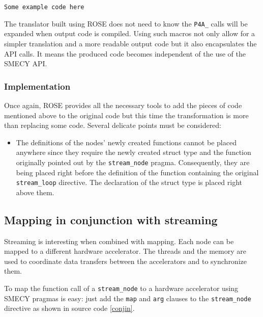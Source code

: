 \documentclass [A4]{article}
\begin{document}
	\begin{lstlisting}[label=streamoutput,caption={}]
	Some example code here
	\end{lstlisting}
	
	The translator built using ROSE does not need to know the \verb+P4A_+ calls will be expanded when output code is compiled. Using such macros not only allow for a simpler translation and a more readable output code but it also encapsulates the API calls. It means the produced code becomes independent of the use of the SMECY API.
	
	\subsubsection{Implementation} Once again, ROSE provides all the necessary tools to add the pieces of code mentioned above to the original code but this time the transformation is more than replacing some code. Several delicate points must be considered:
	\begin{itemize}
		\item The definitions of the nodes' newly created functions cannot be placed anywhere since they require the newly created struct type and the function originally pointed out by the \verb+stream_node+ pragma. Consequently, they are being placed right before the definition of the function containing the original \verb+stream_loop+ directive. The declaration of the struct type is placed right above them.
	\end{itemize}
	
	
	
	\subsection{Mapping in conjunction with streaming}
	Streaming is interesting when combined with mapping. Each node can be mapped to a different hardware accelerator. The threads and the memory are used to coordinate data transfers between the accelerators and to synchronize them.
	
	To map the function call of a \verb+stream_node+ to a hardware accelerator using SMECY pragmas is easy: just add the \verb+map+ and \verb+arg+ clauses to the \verb+stream_node+ directive as shown in source code \ref{conjin}.
		
\end{document}
